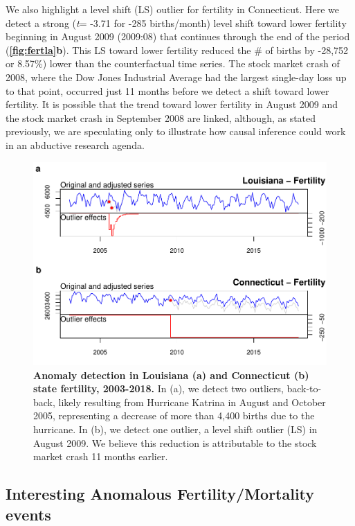 \documentclass[12pt]{article}
\begin{document}
We also highlight a level shift (LS) outlier for fertility in
Connecticut. Here we detect a strong (\emph{t}= -3.71 for -285
births/month) level shift toward lower fertility beginning in August
2009 (2009:08) that continues through the end of the period
(\textbf{\autoref{fig:fertla}b}). This LS toward lower fertility reduced
the \# of births by -28,752 or 8.57\%) lower than the counterfactual
time series. The stock market crash of 2008, where the Dow Jones
Industrial Average had the largest single-day loss up to that point,
occurred just 11 months before we detect a shift toward lower fertility.
It is possible that the trend toward lower fertility in August 2009 and
the stock market crash in September 2008 are linked, although, as stated
previously, we are speculating only to illustrate how causal inference
could work in an abductive research agenda.

\begin{figure}
\centering
\includegraphics{manuscript_files/figure-latex/FertilityAnomalies-1.pdf}
\caption{\textbf{Anomaly detection in Louisiana (a) and Connecticut (b) state fertility, 2003-2018.}
In (a), we detect two outliers, back-to-back, likely resulting from
Hurricane Katrina in August and October 2005, representing a decrease of
more than 4,400 births due to the hurricane. In (b), we detect one
outlier, a level shift outlier (LS) in August 2009. We believe this
reduction is attributable to the stock market crash 11 months earlier.
\label{fig:fertla}}
\end{figure}

\hypertarget{interesting-anomalous-fertilitymortality-events}{%
\subsection{Interesting Anomalous Fertility/Mortality
events}\label{interesting-anomalous-fertilitymortality-events}}
\end{document}
